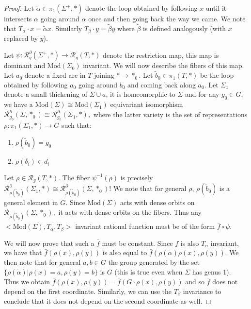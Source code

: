 \documentclass{article}
\newcommand{\Rc}{\mathcal{R}}
\newcommand{\Mod}{\textrm{Mod}}
\begin{document}
 \begin{proof}
    Let $\tilde \alpha \in \pi_1(\Sigma^+, *)$ denote the loop obtained by following $x$ until it intersects $\alpha$ going around $\alpha$ once and then going back the way we came. We note that $T_{\alpha} \cdot x = \tilde \alpha x$. Similarly $T_{\beta}\cdot y = \tilde \beta y$ where $\tilde \beta$ is defined analogously (with $x$ replaced by $y$).

 
     Let $\psi: \Rc_g^{\partial}(\Sigma^+, *) \to \Rc_g(T, *)$ denote the restriction map, this map is dominant and $\Mod(\Sigma_0)$ invariant. We will now describe the fibers of this map. 
     Let $a_0$ denote a fixed arc in $T$ joining $* \to *_0$.  Let $\tilde b_0 \in \pi_1(T, *)$ be the loop obtained by following $a_0$ going around $b_0$ and coming back along $a_0$.  Let $\Sigma_1$ denote a small thickening of $\Sigma \cup a$, it is homeomorphic to $\Sigma$ and for any $g_0 \in G$, we have a $\Mod(\Sigma) \cong \Mod(\Sigma_1)$ equivariant isomorphism $\Rc^{\partial}_{g_0}(\Sigma, *_0) \cong \Rc^{\partial}_{g_0}(\Sigma_1, *),$ where the latter variety is the set of representations $\rho:\pi_1 (\Sigma_1, *) \to G$ such that:
     \begin{enumerate}
         \item $\rho(\tilde b_0) = g_0$
         \item $\rho(\delta_i) \in d_i$
     \end{enumerate}
        
    Let $\rho \in \Rc_g(T, *)$.  The fiber $\psi^{-1}(\rho) $ is precisely $\Rc^{\partial}_{\rho (\tilde b_0)}(\Sigma_1, *) \cong \Rc^{\partial}_{\rho(\tilde b_0)} (\Sigma, *_0)!$ We note that for general $\rho$, $\rho(\tilde b_0)$ is a general element in $G$. Since $\Mod(\Sigma)$ acts with dense orbits on  $\Rc_{\rho(\tilde b_0)} (\Sigma, *_0),$ it acts with dense orbits on the fibers. Thus any  $ \overline{<\Mod(\Sigma) , T_{\alpha} , T_{\beta}>}$ invariant rational function must be of the form $\bar f \circ \psi$. 
    
    We will now prove that such a $\bar f$ must be constant. Since $f$ is also $T_{\alpha}$ invariant, we have that $\bar f(\rho(x), \rho(y))$ is also equal to $\bar f( \rho(\tilde \alpha)\rho(x) ,\rho(y)).$ We then note that for  general $a,b \in G $ the group generated by the set  $\{\rho(\tilde \alpha) | \rho(x) =a , \rho(y) =b\}$ is $G$ (this is true even when $\Sigma$ has genus 1). Thus we obtain $\bar f(\rho(x), \rho(y)) = \bar f(G\cdot\rho(x), \rho(y))$ and so $\bar f$ does not depend on the first coordinate. Similarly, we can use the $T_{\beta}$ invariance to conclude that it does not depend on the second coordinate as well.
 \end{proof}   
\end{document}
